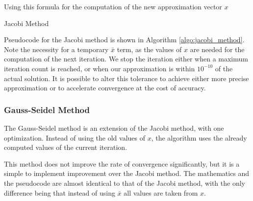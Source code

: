 \documentclass[../fem.tex]{subfiles}
\begin{document}
Using this formula for the computation of the new approximation vector $x$

\begin{algorithm}[H]
  \caption{Jacobi Method}\label{algo:jacobi_method}
  \begin{algorithmic}
    \EndFor
    \EndFor
    \EndIf
    \EndFor
  \end{algorithmic}
\end{algorithm}

Pseudocode for the Jacobi method is shown in Algorithm \ref{algo:jacobi_method}.
Note the necessity for a temporary $\bar{x}$ term, as the values of $x$ are
needed for the computation of the next iteration. We stop the iteration either
when a maximum iteration count is reached, or when our approximation is within
$10^{-10}$ of the actual solution. It is possible to alter this tolerance to
achieve either more precise approximation or to accelerate convergence at the
cost of accuracy.


\subsubsection{Gauss-Seidel Method}%
\label{ssub:gauss_seidel_method}

The Gauss-Seidel method is an extension of the Jacobi method, with one
optimization. Instead of using the old values of $x$, the algorithm uses the
already computed values of the current iteration.

\begin{Figure}
   \begin{center}
     
   \end{center}
   \label{fig:gs_time}
\end{Figure}

This method does not improve the rate of convergence significantly, but it is a
simple to implement improvement over the Jacobi method. The mathematics and the
pseudocode are almost identical to that of the Jacobi method, with the only
difference being that instead of using $\bar{x}$ all values are taken from $x$.
\end{document}

